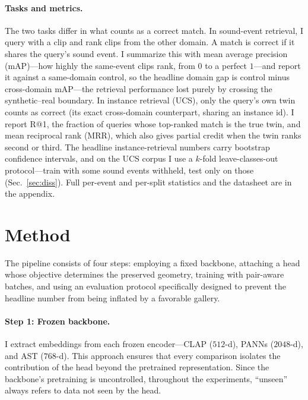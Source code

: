 \documentclass{article}
\begin{document}
\paragraph{Tasks and metrics.} The two tasks differ in what counts as a correct match. In
sound-event retrieval, I query with a clip and rank clips from the other domain. A match is
correct if it shares the query's sound event. I summarize this with mean average precision (mAP)---how
highly the same-event clips rank, from $0$ to a perfect $1$---and report it against a same-domain
control, so the headline domain gap is control minus cross-domain mAP---the retrieval performance lost
purely by crossing the synthetic--real boundary. In instance retrieval (UCS), only the query's own
twin counts as correct (its exact cross-domain counterpart, sharing an instance id). I report R@1,
the fraction of queries whose top-ranked match is the true twin, and mean reciprocal rank (MRR), which
also gives partial credit when the twin ranks second or third. The headline instance-retrieval numbers
carry bootstrap confidence intervals, and on the UCS corpus I use a $k$-fold leave-classes-out protocol---train with some
sound events withheld, test only on those (Sec.~\ref{sec:diss}). Full per-event and per-split
statistics and the datasheet are in the appendix.

\section{Method}
\label{sec:method}
The pipeline consists of four steps: employing a fixed backbone, attaching a head whose objective determines the preserved geometry, training with pair-aware batches, and using an evaluation protocol specifically designed to prevent the headline number from being inflated by a favorable gallery.

\paragraph{Step 1: Frozen backbone.} I extract embeddings from each frozen encoder---CLAP ($512$-d), PANNs ($2048$-d), and AST ($768$-d). This approach ensures that every comparison isolates the contribution of the head beyond the pretrained representation. Since the backbone's pretraining is uncontrolled, throughout the experiments, ``unseen'' always refers to data not seen by the head.
\end{document}
